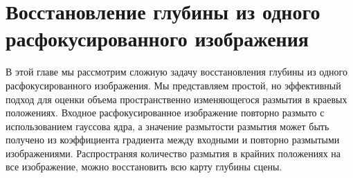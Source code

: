 
\section{Восстановление глубины из одного расфокусированного изображения}

В этой главе мы рассмотрим сложную задачу восстановления глубины из одного расфокусированного изображения. Мы представляем простой, но эффективный подход для оценки объема пространственно изменяющегося размытия в краевых положениях. Входное расфокусированное изображение повторно размыто с использованием гауссова ядра, а значение размытости размытия может быть получено из коэффициента градиента между входными и повторно размытыми изображениями. Распространяя количество размытия в крайних положениях на все изображение, можно восстановить всю карту глубины сцены.